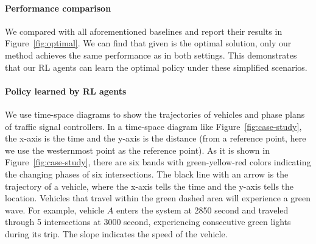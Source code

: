 \paragraph{Performance comparison}
We compared \PressLight with all aforementioned baselines and report their results in Figure~\ref{fig:optimal}. We can find that given \Greenwave is the optimal solution, only our method \PressLight achieves the same performance as \Greenwave in both settings. This demonstrates that our RL agents can learn the optimal policy under these simplified scenarios.



\paragraph{Policy learned by RL agents}
We use time-space diagrams to show the trajectories of vehicles and phase plans of traffic signal controllers. In a time-space diagram like Figure~\ref{fig:case-study}, the x-axis is the time and the y-axis is the distance (from a reference point, here we use the westernmost point as the reference point). As it is shown in Figure~\ref{fig:case-study}, there are six bands with green-yellow-red colors indicating the changing phases of six intersections. The black line with an arrow is the trajectory of a vehicle, where the x-axis tells the time and the y-axis tells the location. Vehicles that travel within the green dashed area will experience a green wave. For example, vehicle $A$ enters the system at 2850 second and traveled through 5 intersections at 3000 second, experiencing consecutive green lights during its trip. The slope indicates the speed of the vehicle. 


